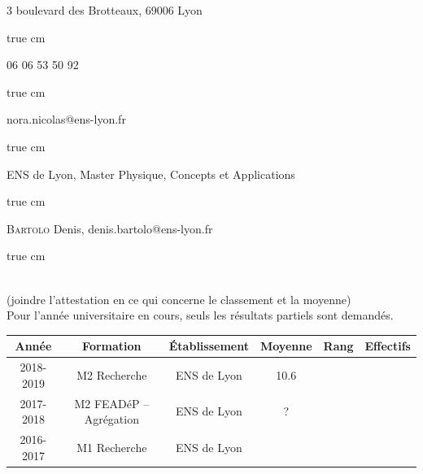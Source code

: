 \documentclass[11pt,a4]{article}
\begin{document}

 3 boulevard des Brotteaux, 69006 Lyon

 true cm

 06 06 53 50 92

 true cm

 nora.nicolas@ens-lyon.fr

 true cm

 ENS de Lyon, Master Physique, Concepts et Applications

 true cm

\textsc{Bartolo} Denis, denis.bartolo@ens-lyon.fr

 true cm

 \\ (joindre l'attestation en ce qui concerne le classement et la
moyenne) \\ Pour l'année universitaire en cours, seuls les résultats partiels sont demandés.

\begin{center}
    \begin{tabular}{|c|c|c|c|c|c|} \cline{1-6}
 Année  & Formation & Établissement & Moyenne & Rang & Effectifs \\ \hline 
        2018-2019   & M2 Recherche  & ENS de Lyon  & 10.6  &  &  \\ \hline
        2017-2018   & M2 FEADéP -- Agrégation  & ENS de Lyon  & ?  &  &  \\ \hline
        2016-2017   & M1 Recherche & ENS de Lyon &  &  &  \\ \hline
    \end{tabular}
\end{center}

\newpage
{} \\ 
\end{document}

